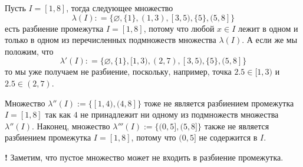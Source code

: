 \begin{example}
  Пусть $I = [1,8]$, тогда следующее множество
  \[
   \lambda(I) : = \{ \varnothing, \{1\}, (1,3), [3,5), \{5\}, (5,8]  \}
  \]
есть разбиение промежутка $I = [1,8]$, потому что любой $x \in I$ лежит в одном и только в одном из перечисленных подмножеств множества $\lambda(I)$. А если же мы положим, что
\[
 \lambda'(I): = \{ \varnothing, \{1\}, [1,3), (2,7), [3,5), \{5\}, (5,8] \}
\]
то мы уже получаем не разбиение, поскольку, например, точка $2.5 \in [1,3)$ и $2.5 \in (2,7)$.

Множество $\lambda''(I) := \{[1,4), (4,8]\}$ тоже не является разбиением промежутка $I = [1,8]$ так как $4$ не принадлежит ни одному из подмножеств множества $\lambda''(I)$. Наконец, множество $\lambda'''(I) := \{(0,5], (5,8]\}$ также не является разбиением промежутка $I = [1,8]$, потому что $(0,5]$ не содержится в $I.$
\end{example}

\begin{mydanger}{\bf !}
    Заметим, что пустое множество может не входить в разбиение промежутка. 
\end{mydanger}


